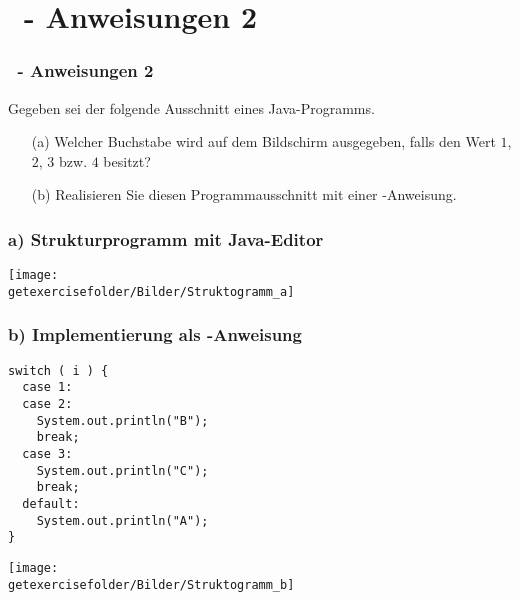 \def\stitle{\theexercise\ - Anweisungen 2}
\section{\stitle}
\begin{frame}[t]%
    \frametitle{\stitle}

Gegeben sei der folgende Ausschnitt eines Java-Programms.


\begin{itemize}
\item[(a)] Welcher Buchstabe wird auf dem Bildschirm ausgegeben, falls  den Wert $1$, $2$, $3$ bzw. $4$ besitzt?
\item[(b)] Realisieren Sie diesen Programmausschnitt mit einer -Anweisung.
\end{itemize}
\end{frame}


\begin{frame}[fragile]%
 \frametitle{a) Strukturprogramm mit Java-Editor}%

\begin{center}

\texttt{[image: \\getexercisefolder/Bilder/Struktogramm\_a]}
\end{center}
\end{frame}


\begin{frame}[fragile]%
 \frametitle{b) Implementierung als -Anweisung}%

\begin{center}
\begin{minipage}{0.7\textwidth}
\begin{lstlisting}[style=JAVA]
switch ( i ) {
  case 1:
  case 2:
    System.out.println("B");
    break;
  case 3:
    System.out.println("C");
    break;
  default:
    System.out.println("A");
}
\end{lstlisting}

\end{minipage}

\texttt{[image: \\getexercisefolder/Bilder/Struktogramm\_b]}
\end{center}

\end{frame}
